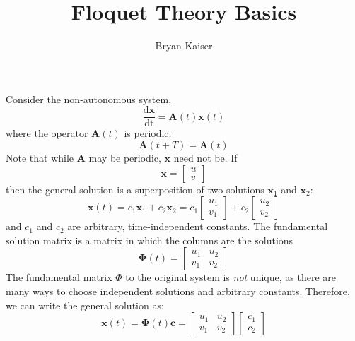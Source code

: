 \documentclass{article}
\title{Floquet Theory Basics}
\author{Bryan Kaiser}
\begin{document}
\maketitle

Consider the non-autonomous system, 
\begin{equation}
 \frac{\mathrm{d}\mathbf{x}}{\mathrm{dt}}=\mathbf{A}(t)\mathbf{x}(t)
\end{equation}
where the operator $\mathbf{A}(t)$ is periodic:
\begin{equation}
 \mathbf{A}(t+T)=\mathbf{A}(t)
\end{equation}
Note that while $\mathbf{A}$ may be periodic, $\mathbf{x}$ need not be.
If
\begin{equation}
 \mathbf{x}=\begin{bmatrix*}
  u \\
  v
 \end{bmatrix*}
\end{equation}
then the general solution is a superposition of two solutions $\mathbf{x}_1$ and $\mathbf{x}_2$:
\begin{equation}
 \mathbf{x}(t)=c_1\mathbf{x}_1+c_2\mathbf{x}_2
 =c_1\begin{bmatrix*}
  u_1 \\
  v_1
 \end{bmatrix*}+c_2\begin{bmatrix*}
  u_2 \\
  v_2
 \end{bmatrix*}
\end{equation}
and $c_1$ and $c_2$ are arbitrary, time-independent constants.
The fundamental solution matrix is a matrix in which the columns are the solutions
\begin{equation}
 \boldsymbol{\Phi}(t)=\begin{bmatrix*}
 u_1 & u_2 \\
 v_1 & v_2
 \end{bmatrix*}
\end{equation}
The fundamental matrix $\Phi$ to the original system is \textit{not} unique, as there are many ways to 
choose independent solutions and arbitrary constants. 
Therefore, we can write the general solution as:
\begin{equation}
 \mathbf{x}(t)=\boldsymbol{\Phi}(t)\mathbf{c}=\begin{bmatrix*}
 u_1 & u_2 \\
 v_1 & v_2
 \end{bmatrix*}
  \begin{bmatrix*}
  c_1 \\
  c_2
 \end{bmatrix*}
 \label{eq:gen_soln}
\end{equation}
\end{document}
